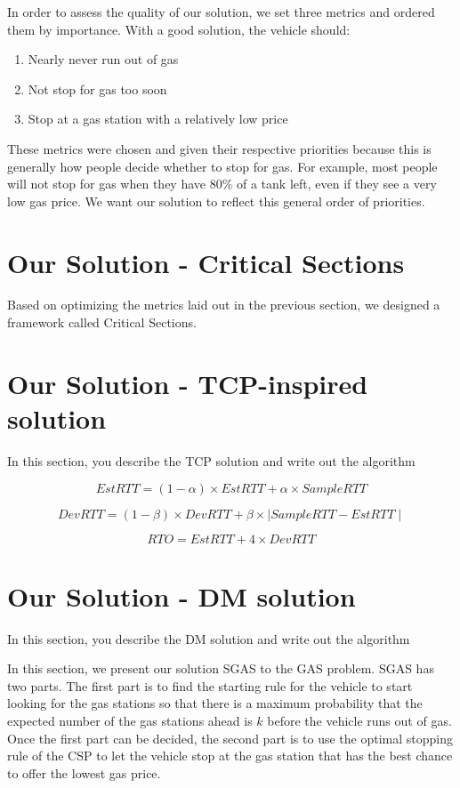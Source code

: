 \documentclass[conference]{IEEEtran}
\theoremstyle{definition}
\begin{document}
In order to assess the quality of our solution, we set three metrics and ordered them by importance. With a good solution, the vehicle should:

\begin{enumerate}
\item Nearly never run out of gas
\item Not stop for gas too soon
\item Stop at a gas station with a relatively low price
\end{enumerate}

These metrics were chosen and given their respective priorities because this is generally how people decide whether to stop for gas. For example, most people will not stop for gas when they have 80\% of a tank left, even if they see a very low gas price. We want our solution to reflect this general order of priorities.

\section{Our Solution - Critical Sections}
Based on optimizing the metrics laid out in the previous section, we designed a framework called Critical Sections. 

\section{Our Solution - TCP-inspired solution}
{\color{red} In this section, you describe the TCP solution and write out the algorithm}

\begin{equation}
EstRTT = (1-\alpha)\times EstRTT + \alpha \times SampleRTT
\end{equation}

\begin{equation}
DevRTT = (1-\beta)\times DevRTT + \beta \times \mid SampleRTT - EstRTT \mid
\end{equation}

\begin{equation}
RTO = EstRTT + 4\times DevRTT
\end{equation}

\section{Our Solution - DM solution}
{\color{red} In this section, you describe the DM solution and write out the algorithm}


In this section, we present our solution SGAS to the GAS problem. SGAS has two parts. The first part is to find the starting rule for the vehicle to start looking for the gas stations so that there is a maximum probability that the expected number of the gas stations ahead is $k$ before the vehicle runs out of gas. Once the first part can be decided, the second part is to use the optimal stopping rule of the CSP to let the vehicle stop at the gas station that has the best chance to offer the lowest gas price.
\end{document}
